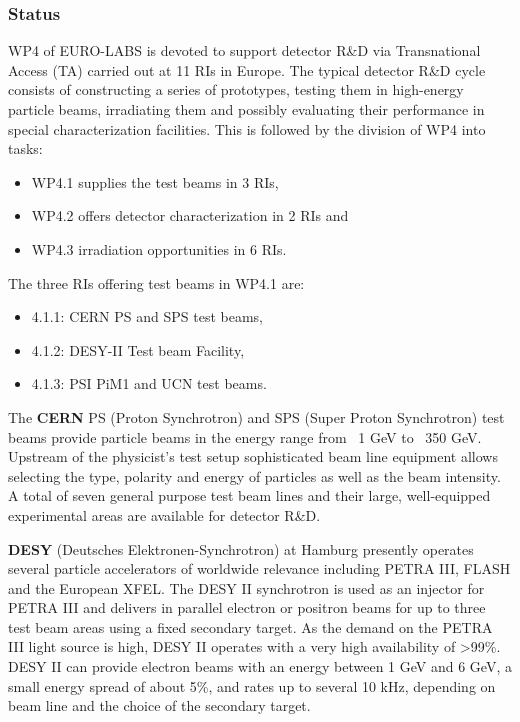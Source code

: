 \subsubsection*{Status}
WP4 of EURO-LABS is devoted to support detector R\&D via Transnational Access (TA) carried out at 11 RIs in Europe. The typical detector R\&D cycle consists of constructing a series of prototypes, testing them in high-energy particle beams, irradiating them and possibly evaluating their performance in special characterization facilities. This is followed by the division of WP4 into tasks: 
\begin{itemize}
    \item WP4.1 supplies the test beams in 3 RIs, 
    \item WP4.2 offers detector characterization in 2 RIs and
    \item WP4.3 irradiation opportunities in 6 RIs.
\end{itemize}

The three RIs offering test beams in WP4.1 are:
\begin{itemize}
    \item 4.1.1: CERN PS and SPS test beams,
    \item 4.1.2: DESY-II Test beam Facility,
    \item 4.1.3: PSI PiM1 and UCN test beams.
\end{itemize}

The \textbf{CERN} PS (Proton Synchrotron) and SPS (Super Proton Synchrotron) test beams provide particle beams in the energy range from ~1 GeV to ~350 GeV. Upstream of the physicist’s test setup sophisticated beam line equipment allows selecting the type, polarity and energy of particles as well as the beam intensity. A total of seven general purpose test beam lines and their large, well-equipped experimental areas are available for detector R\&D.

\textbf{DESY} (Deutsches Elektronen-Synchrotron) at Hamburg presently operates several particle accelerators of worldwide relevance including PETRA III, FLASH and the European XFEL. The DESY II synchrotron is used as an injector for PETRA III and delivers in parallel electron or positron beams for up to three test beam areas using a fixed secondary target. As the demand on the PETRA III light source is high, DESY II operates with a very high availability of >99\%. DESY II can provide electron beams with an energy between 1 GeV and 6 GeV, a small energy spread of about 5\%, and rates up to several 10 kHz, depending on beam line and the choice of the secondary target. 


